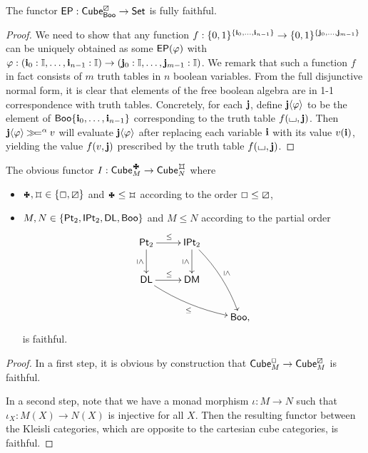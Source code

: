 \documentclass[a4paper]{memoir}
\begin{document}
\begin{proposition} \label{thm:booleanalg-ff}
	The functor $\mathsf{EP} : {\mathsf{Cube}}^\boxslash_{\mathsf{Boo}} \to {\mathsf{Set}}$ is fully faithful.
\end{proposition}
\begin{proof}
	We need to show that any function $f : \mathopen{}\left\{ 0, 1 \right\}\mathclose{}^{\mathopen{}\left\{ \mathbf{i}_0, \ldots, \mathbf{i}_{n-1} \right\}\mathclose{}} \to \mathopen{}\left\{ 0, 1 \right\}\mathclose{}^{\mathopen{}\left\{ \mathbf{j}_0, \ldots, \mathbf{j}_{m-1} \right\}\mathclose{}}$
	can be uniquely obtained as some $\mathsf{EP}(\varphi)$ with $\varphi : (\mathbf{i}_0 : {\mathbb I}, \ldots, \mathbf{i}_{n-1} : {\mathbb I}) \to (\mathbf{j}_0 : {\mathbb I}, \ldots, \mathbf{j}_{m-1} : {\mathbb I})$.
	We remark that such a function $f$ in fact consists of $m$ truth tables in $n$ boolean variables.
	From the full disjunctive normal form, it is clear that elements of the free boolean algebra are in 1-1 correspondence with truth tables.
	Concretely, for each $\mathbf{j}$, define $\mathbf{j} \langle \varphi \rangle$ to be the element of $\mathsf{Boo} \mathopen{}\left\{ \mathbf{i}_0, \ldots, \mathbf{i}_{n-1} \right\}\mathclose{}$ corresponding to the truth table $f({\llcorner\hspace{-.4ex}\lrcorner}, \mathbf{j})$.
	Then $\mathbf{j} \langle \varphi \rangle \mathbin{\gg\hspace{-.5ex}=}^\alpha v$ will evaluate $\mathbf{j} \langle \varphi \rangle$ after replacing each variable $\mathbf{i}$ with its value $v(\mathbf{i})$, yielding the value $f(v, \mathbf{j})$ prescribed by the truth table $f({\llcorner\hspace{-.4ex}\lrcorner}, \mathbf{j})$.
\end{proof}
\begin{proposition} \label{thm:monad-coercions-faithful}
	The obvious functor $I : \cubecat_M^\mycubey \to \cubecat_N^\mycubex$ where
	\begin{itemize}
		\item $\mycubey, \mycubex \in \accol{\affine, \cartes}$ and $\mycubey \leq \mycubex$ according to the order $\Box \leq \boxslash$,
		\item $M, N \in \mathopen{}\left\{ {\mathsf{Pt}_2}, {\mathsf{IPt}_2}, \mathsf{DL}, \mathsf{Boo} \right\}\mathclose{}$ and $M \leq N$ according to the partial order
		\[
			\xymatrix{
				\bipointed
					\ar[r]^\leq
					\ar[d]_{\rotatebox{270}{$\scriptstyle\leq$}}
				& \bipointedsym
					\ar[d]_{\rotatebox{270}{$\scriptstyle\leq$}}
					\ar@/^/[ddr]^{\rotatebox{270}{$\scriptstyle\leq$}}
				\\
				\distlattice
					\ar[r]^\leq
					\ar@/_/[rrd]_\leq
				& \demorgan
				\\
				&& \booleanalg,
			}
		\]
		is faithful.
	\end{itemize}
\end{proposition}
\begin{proof}
	In a first step, it is obvious by construction that ${\mathsf{Cube}}^\Box_M \to {\mathsf{Cube}}^\boxslash_M$ is faithful.
	
	In a second step, note that we have a monad morphism $\iota : M \to N$ such that $\iota_X : M(X) \to N(X)$ is injective for all $X$. Then the resulting functor between the Kleisli categories, which are opposite to the cartesian cube categories, is faithful.
\end{proof}
\end{document}
